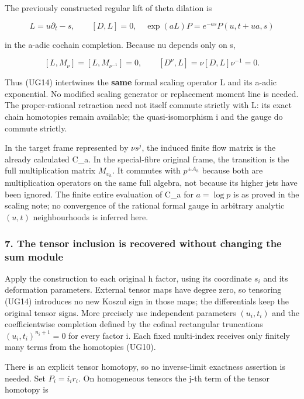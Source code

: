 The previously constructed regular lift of theta dilation is

\[
L=u\partial_t-s,\qquad [D,L]=0,
\quad \exp(aL)P=e^{-as}P(u,t+ua,s)
\tag{UG16}
\]

in the a-adic cochain completion. Because nu depends only on s,

\[
[L,M_\nu]=[L,M_{\nu^{-1}}]=0,
\qquad[D^{\nu},L]=\nu[D,L]\nu^{-1}=0.
\tag{UG17}
\]

Thus (UG14) intertwines the \textbf{same} formal scaling operator L and its a-adic exponential. No modified scaling generator or replacement moment line is needed. The proper-rational retraction need not itself commute strictly with L: its exact chain homotopies remain available; the quasi-isomorphism i and the gauge do commute strictly.

In the target frame represented by \(\nu s^j\), the induced finite flow matrix is the already calculated C\_a. In the special-fibre original frame, the transition is the full multiplication matrix \(M_{\upsilon_h}\). It commutes with \(p^{\pm A_h}\) because both are multiplication operators on the same full algebra, not because its higher jets have been ignored. The finite entire evaluation of C\_a for \(a=\log p\) is as proved in the scaling note; no convergence of the rational formal gauge in arbitrary analytic \((u,t)\) neighbourhoods is inferred here.

\subsubsection{7. The tensor inclusion is recovered without changing the sum module}\label{endpoint-f1_unit_gauge--the-tensor-inclusion-is-recovered-without-changing-the-sum-module}

Apply the construction to each original h factor, using its coordinate \(s_i\) and its deformation parameters. External tensor maps have degree zero, so tensoring (UG14) introduces no new Koszul sign in those maps; the differentials keep the original tensor signs. More precisely use independent parameters \((u_i,t_i)\) and the coefficientwise completion defined by the cofinal rectangular truncations \((u_i,t_i)^{n_i+1}=0\) for every factor i. Each fixed multi-index receives only finitely many terms from the homotopies (UG10).

There is an explicit tensor homotopy, so no inverse-limit exactness assertion is needed. Set \(P_i=i_i r_i\). On homogeneous tensors the j-th term of the tensor homotopy is

